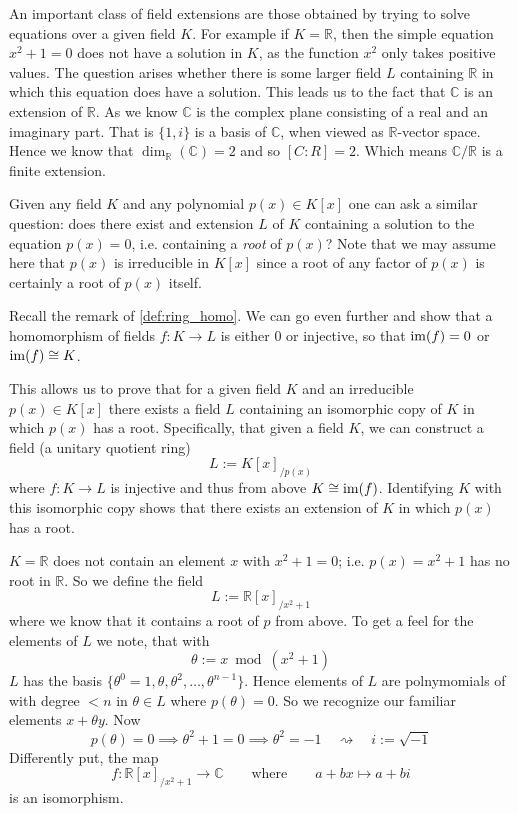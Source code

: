 \begin{example}
   An important class of field extensions are those obtained by trying to solve equations over a given field \(K\).
   For example if \(K = \mathbb{R}\), then the simple equation \(x^2 + 1 = 0\) does not have a solution in \(K\), as the function \(x^2\) only takes positive values.
   The question arises whether there is some larger field \(L\) containing \(\mathbb{R}\) in which this equation does have a solution.
   This leads us to the fact that \(\mathbb{C}\) is an extension of \(\mathbb{R}\).
   As we know \(\mathbb{C}\) is the complex plane consisting of a real and an imaginary part.
   That is \(\{1, i\}\) is a basis of \(\mathbb{C}\), when viewed as \(\mathbb{R}\)-vector space.
   Hence we know that \(\dim_\mathbb{R}(\mathbb{C}) = 2\) and so \([C:R] = 2\).
   Which means \(\mathbb{C}/\mathbb{R}\) is a finite extension.
\end{example}

Given any field \(K\) and any polynomial \(p(x) \in K[x]\) one can ask a similar question: does there exist and extension \(L\) of \(K\) containing a solution to the equation \(p(x) = 0\), i.e. containing a \emph{root} of \(p(x)\)?
Note that we may assume here that \(p(x)\) is irreducible in \(K[x]\) since a root of any factor of \(p(x)\) is certainly a root of \(p(x)\) itself.

Recall the remark of \cref{def:ring_homo}.
We can go even further and show that a homomorphism of fields \(f: K \to L\) is either 0 or injective, so that \(\operatorname{im}(f) = 0\) or \(\operatorname{im}(f) \cong K\).

This allows us to prove that for a given field \(K\) and an irreducible \(p(x) \in K[x]\) there exists a field \(L\) containing an isomorphic copy of \(K\) in which \(p(x)\) has a root.
Specifically, that given a field \(K\), we can construct a field (a unitary quotient ring)
\[L := K[x]_{/p(x)}\]
where \(f: K \to L\) is injective and thus from above \(K \cong \operatorname{im}(f)\).
Identifying \(K\) with this isomorphic copy shows that there exists an extension of \(K\) in which \(p(x)\) has a root.

\begin{example}
   \(K = \mathbb{R}\) does not contain an element \(x\) with \(x^2 + 1 = 0\); i.e. \(p(x) = x^2 + 1\) has no root in \(\mathbb{R}\).
   So we define the field
   \[L := \mathbb{R}[x]_{/x^2 + 1}\]
   where we know that it contains a root of \(p\) from above.
   To get a feel for the elements of \(L\) we note, that with
   \[\theta := x \bmod (x^2 + 1)\]
   \(L\) has the basis \(\{\theta^0 = 1, \theta, \theta^2, \ldots, \theta^{n-1}\}\).
   Hence elements of \(L\) are polnymomials of with degree \(< n\) in \(\theta \in L\) where \(p(\theta) = 0\).
   So we recognize our familiar elements \(x + \theta y\).
   Now
   \[p(\theta) = 0 \implies \theta^2 + 1 = 0 \implies \theta^2 = -1 \quad\rightsquigarrow\quad i := \sqrt{-1}\]
   Differently put, the map
   \[f: \mathbb{R}[x]_{/x^2 + 1} \to \mathbb{C} \qquad\text{where}\qquad a + bx \mapsto a+bi\]
   is an isomorphism.
\end{example}


